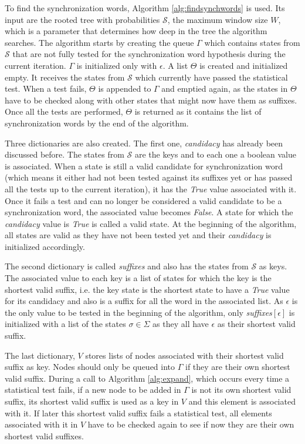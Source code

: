 {To find the synchronization words, Algorithm \ref{alg:findsynchwords} is used. Its input are the rooted tree with probabilities $\mathcal{S}$, the maximum window size $W$, which is a parameter that determines how deep in the tree the algorithm searches. The algorithm starts by creating the queue $\Gamma$ which contains states from $\mathcal{S}$ that are not fully tested for the synchronization word hypothesis during the current iteration. $\Gamma$ is initialized only with $\epsilon$. A list $\Theta$ is created and initialized empty. It receives the states from $\mathcal{S}$ which currently have passed the statistical test. When a test fails, $\Theta$ is appended to $\Gamma$ and emptied again, as the states in $\Theta$ have to be checked along with other states that might now have them as suffixes. Once all the tests are performed, $\Theta$ is returned as it contains the list of synchronization words by the end of the algorithm.
 
 Three dictionaries are also created. The first one, \textit{candidacy} has already been discussed before. The states from $\mathcal{S}$ are the keys and to each one a boolean value is associated. When a state is still a valid candidate for synchronization word (which means it either had not been tested against its suffixes yet or has passed all the tests up to the current iteration), it has the \textit{True} value associated with it. Once it fails a test and can no longer be considered a valid candidate to be a synchronization word, the associated value becomes \textit{False}. A state for which the \textit{candidacy} value is \textit{True} is called a valid state. At the beginning of the algorithm, all states are valid as they have not been tested yet and their \textit{candidacy} is initialized accordingly.
 
 The second dictionary is called \textit{suffixes} and also has the states from $\mathcal{S}$ as keys. The associated value to each key is a list of states for which the key is the shortest valid suffix, i.e. the key state is the shortest state to have a \textit{True} value for its candidacy and also is a suffix for all the word in the associated list. As $\epsilon$ is the only value to be tested in the beginning of the algorithm, only \textit{suffixes}$[\epsilon]$ is initialized with a list of the states  $\sigma \in \Sigma$ as they all have $\epsilon$ as their shortest valid suffix.
 
 The last dictionary, $V$ stores lists of nodes associated with their shortest valid suffix as key. Nodes should only be queued into $\Gamma$ if they are their own shortest valid suffix. During a call to Algorithm \ref{alg:expand}, which occurs every time a statistical test fails, if a new node to be added in $\Gamma$ is not its own shortest valid suffix, its shortest valid suffix is used as a key in $V$ and this element is associated with it. If later this shortest valid suffix fails a statistical test, all elements associated with it in $V$ have to be checked again to see if now they are their own shortest valid suffixes.
 
}
